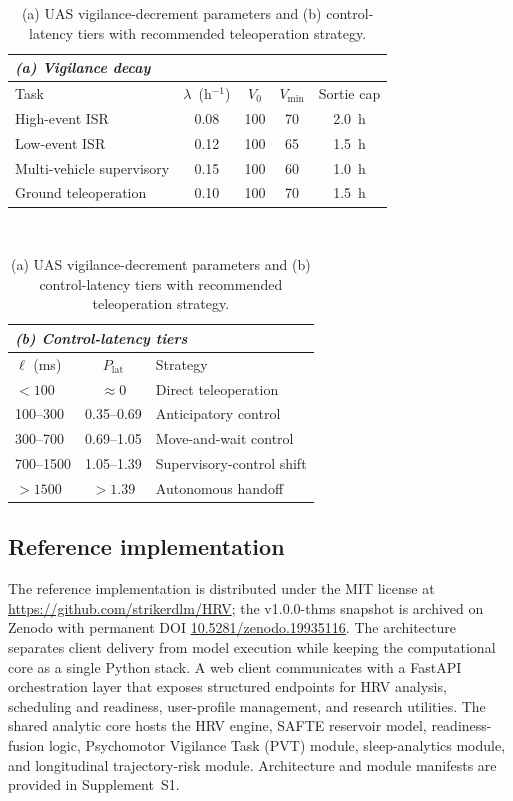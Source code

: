 \documentclass[10pt,journal,twocolumn,compsoc]{IEEEtran}
\begin{document}
\begin{table}[t]
\caption{(a) UAS vigilance-decrement parameters and (b) control-latency tiers with recommended teleoperation strategy.}
\label{tab:vig-lat}
\centering
\renewcommand{\arraystretch}{1.05}
\begin{tabular}{@{}lcccc@{}}
\multicolumn{5}{l}{\textit{(a) Vigilance decay}}\\
\toprule
Task & $\lambda$~(h$^{-1}$) & $V_0$ & $V_{\min}$ & Sortie cap \\
\midrule
High-event ISR             & 0.08 & 100 & 70 & 2.0~h \\
Low-event ISR              & 0.12 & 100 & 65 & 1.5~h \\
Multi-vehicle supervisory  & 0.15 & 100 & 60 & 1.0~h \\
Ground teleoperation       & 0.10 & 100 & 70 & 1.5~h \\
\bottomrule
\end{tabular}\\[6pt]
\begin{tabular}{@{}lcl@{}}
\multicolumn{3}{l}{\textit{(b) Control-latency tiers}}\\
\toprule
$\ell$ (ms) & $P_{\mathrm{lat}}$ & Strategy \\
\midrule
$<100$       & $\approx 0$        & Direct teleoperation     \\
100--300     & 0.35--0.69         & Anticipatory control     \\
300--700     & 0.69--1.05         & Move-and-wait control    \\
700--1500    & 1.05--1.39         & Supervisory-control shift\\
$>1500$      & $>1.39$            & Autonomous handoff       \\
\bottomrule
\end{tabular}
\end{table}

\subsection{Reference implementation}
\label{sec:refimpl}
The reference implementation is distributed under the MIT license at \url{https://github.com/strikerdlm/HRV}; the v1.0.0-thms snapshot is archived on Zenodo with permanent DOI \href{https://doi.org/10.5281/zenodo.19935116}{10.5281/zenodo.19935116}. The architecture separates client delivery from model execution while keeping the computational core as a single Python stack. A web client communicates with a FastAPI orchestration layer that exposes structured endpoints for HRV analysis, scheduling and readiness, user-profile management, and research utilities. The shared analytic core hosts the HRV engine, SAFTE reservoir model, readiness-fusion logic, Psychomotor Vigilance Task (PVT) module, sleep-analytics module, and longitudinal trajectory-risk module. Architecture and module manifests are provided in Supplement~S1.
\end{document}
